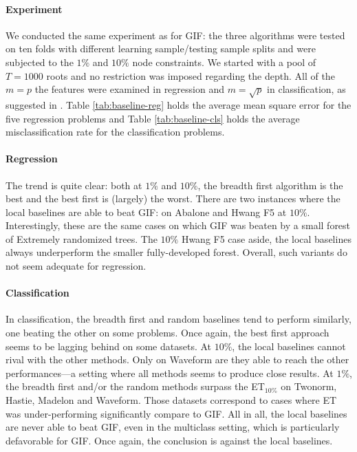 \documentclass{article}
\begin{document}
\paragraph{Experiment}
We conducted the same experiment as for GIF: the three algorithms were tested 
on ten folds with different learning sample/testing sample splits and were 
subjected to the $1\%$ and $10\%$ node constraints. We started with a pool of 
$T=1000$ roots and no restriction was imposed regarding the depth. All of the 
$m=p$ the features were examined in regression and $m=\sqrt{p}$ in 
classification, as suggested in \cite{extratrees}. Table \ref{tab:baseline-reg} 
holds the average mean square error for the five regression problems and Table 
\ref{tab:baseline-cls} holds the average misclassification rate for the 
classification problems.

\paragraph{Regression}
The trend is quite clear: both at $1\%$ and $10\%$, the breadth first algorithm 
is the best and the best first is (largely) the worst. 
There are two instances where the local baselines are able to beat GIF: on 
Abalone and Hwang F5 at $10\%$. Interestingly, these are the same cases on 
which GIF was beaten by a small forest of Extremely randomized trees. The 
$10\%$ Hwang F5 case aside, the local baselines always underperform the smaller 
fully-developed forest. Overall, such variants do not seem adequate for 
regression.

\paragraph{Classification}
In classification, the breadth first and random baselines tend to perform 
similarly, one beating the other on some problems. Once again, the best first 
approach seems to be lagging behind on some datasets. At $10\%$, the local 
baselines cannot rival with the other methods. Only on Waveform are they able 
to reach the other performances---a setting where all methods seems to produce 
close results. At $1\%$, the breadth first and/or the random methods surpass 
the ET$_{10\%}$ on Twonorm, Hastie, Madelon and Waveform. Those datasets 
correspond to cases where ET was under-performing significantly compare to GIF. 
All in all, the local baselines are never able to beat GIF, even in the 
multiclass setting, which is particularly defavorable for GIF. Once again, the 
conclusion is against the local baselines.
\end{document}
